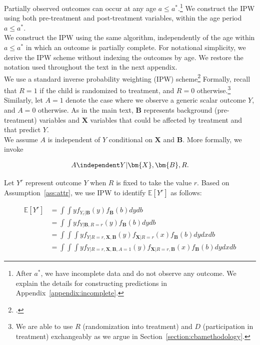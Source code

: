 \noindent Partially observed outcomes can occur at any age $a \leq a^*$.\footnote{After $a^*$, we have incomplete data and do not observe any outcome. We explain the details for constructing predictions in Appendix~\ref{appendix:incomplete}.} We construct the IPW using both pre-treatment and post-treatment variables, within the age period  $a \leq a^*$.\\

\noindent We construct the IPW using the same algorithm, independently of the age within $a \leq a^*$ in which an outcome is partially complete. For notational simplicity, we derive the IPW scheme without indexing the outcomes by age. We restore the notation used throughout the text in the next appendix.\\

\noindent We use a standard inverse probability weighting (IPW) scheme\footnote{\citet{Horvitz_Thompson_1952_JASA}.} Formally, recall that $R = 1$ if the child is randomized to treatment, and $R = 0$ otherwise.\footnote{We are able to use $R$ (randomization into treatment) and $D$ (participation in treatment) exchangeably as we argue in Section~\ref{section:cbamethodology}.} Similarly, let $A = 1$ denote the case where we observe a generic scalar outcome $Y$, and $A = 0$ otherwise. As in the main text, $\bm{B}$ represents background (pre-treatment) variables and $\bm{X}$ variables that could be affected by treatment and that predict $Y$.\\

\noindent We assume $A$ is independent of $Y$ conditional on $\bm{X}$ and $\bm{B}$. More formally, we invoke

\begin{assumption} \label{ass:attr}
	\begin{align*}
		A \independent Y | \bm{X}, \bm{B}, R.
	\end{align*}
\end{assumption}

\noindent Let $Y^{r}$ represent outcome $Y$ when $R$ is fixed to take the value $r$. Based on Assumption~\ref{ass:attr}, we use IPW to identify $\mathbb{E}[Y^r]$ as follows:

\begin{align} \label{eq:case2}
\mathbb{E}[Y^r] & = \int \int y f_{ Y_ r| \bm{B} } (y) f_{\bm{B}} (b) dydb \\ \nonumber
	           & = \int \int y f_{Y| \bm{B}, R=r}(y) f_{\bm{B}} (b) dydb \\ \nonumber
	           & = \int \int \int y f_{Y|R=r,\bm{X}, \bm{B}} (y) f_{\bm{X} | R=r} (x) f_{\bm{B}} (b) dydxdb \\ \nonumber
				& = \int \int \int y f_{Y|R=r,\bm{X}, \bm{B}, A=1} (y) f_{\bm{X} | R=r, \bm{B} }(x) f_{\bm{B}} (b) dydxdb
\end{align}


